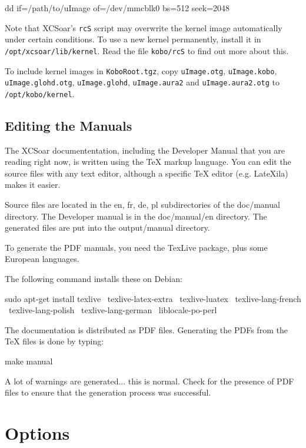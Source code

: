 \begin{verbatim*}
dd if=/path/to/uImage of=/dev/mmcblk0 bs=512 seek=2048
\end{verbatim*}

Note that XCSoar's \texttt{rcS} script may overwrite the kernel image
automatically under certain conditions.  To use a new kernel
permanently, install it in \texttt{/opt/xcsoar/lib/kernel}.  Read the
file \texttt{kobo/rcS} to find out more about this.

To include kernel images in \texttt{KoboRoot.tgz}, copy
\texttt{uImage.otg}, \texttt{uImage.kobo}, \texttt{uImage.glohd.otg},
\texttt{uImage.glohd}, \texttt{uImage.aura2} and \texttt{uImage.aura2.otg} to
\texttt{/opt/kobo/kernel}.

\subsection{Editing the Manuals}

The XCSoar documententation, including the Developer Manual that you are 
reading right now, is written using the TeX markup language. You can edit
the source files with any text editor, although a specific TeX editor (e.g. LateXila) 
makes it easier. 

Source files are located in the en, fr, de, pl subdirectories of the doc/manual directory. 
The Developer manual is in the doc/manual/en directory. The generated files are put into
the output/manual directory.

To generate the PDF manuals, you need the TexLive package, plus some European languages.

The following command installs these on Debian:

\begin{verbatim*}
sudo apt-get install texlive \
  texlive-latex-extra \
  texlive-luatex \
  texlive-lang-french \
  texlive-lang-polish \
  texlive-lang-german \
  liblocale-po-perl
\end{verbatim*}

The documentation is distributed as PDF files. Generating the PDFs from the 
TeX files is done by typing:

\begin{verbatim*}
make manual
\end{verbatim*}

A lot of warnings are generated... this is normal. Check for the presence of PDF files 
to ensure that the generation process was successful.
\section{Options}

